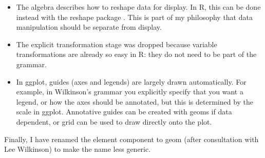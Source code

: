 \begin{itemize}
	\item The algebra describes how to reshape data for display.  In R, this can be done instead with the reshape package \citep{reshape}.  This is part of my philosophy that data manipulation should be separate from display.

	\item The explicit transformation stage was dropped because variable transformations are already so easy in R: they do not need to be part of the grammar.
	
	\item In ggplot, guides (axes and legends) are largely drawn automatically.  For example, in Wilkinson's grammar you explicitly specify that you want a legend, or how the axes should be annotated, but this is determined by the scale in ggplot.  Annotative guides can be created with geoms if data dependent, or grid can be used to draw directly onto the plot.
\end{itemize}

Finally, I have renamed the element component to geom (after consultation with Lee Wilkinson) to make the name less generic.  

% 
% 
% 
% 
% 
% 
% 
% 
% 

